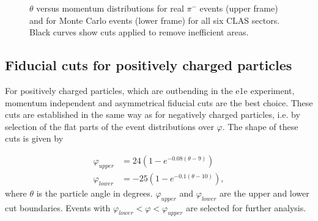 \begin{figure}[htp]
\begin{center}
\begin{minipage}{.99\textwidth}
\begin{framed}
\end{framed}
\end{minipage}
\caption{\small $\theta$ versus momentum distributions for real $\pi^{-}$ events (upper frame)  and for Monte Carlo events (lower frame) for all six CLAS sectors. Black curves show cuts applied to remove inefficient areas. \label{fig:other_cuts_negaitive_th_vs_p_pions}}
\end{center}
\end{figure}

\subsection{Fiducial cuts for positively charged particles}
\label{fiduch_positive}
For positively charged particles, which are outbending in the e1e experiment, momentum independent and asymmetrical fiducial cuts are the best choice. These cuts are established in the same way as for negatively charged particles, i.e.
by selection of the flat parts of the event distributions over $\varphi$.
The shape of these cuts is given by

\begin{equation}
\begin{aligned}
\varphi_{upper} & =  24(1-e^{-0.08(\theta-9)}) \\
\varphi_{lower} & = -25(1-e^{-0.1(\theta-10)}),   
\label{eq:fiduch_positive}
\end{aligned}  
\end{equation}
where $\theta$ is the particle angle in degrees. $\varphi_{upper}$ and $\varphi_{lower}$ are the upper and lower cut boundaries. Events with $\varphi_{lower} < \varphi < \varphi_{upper}$ are selected for further analysis. 

